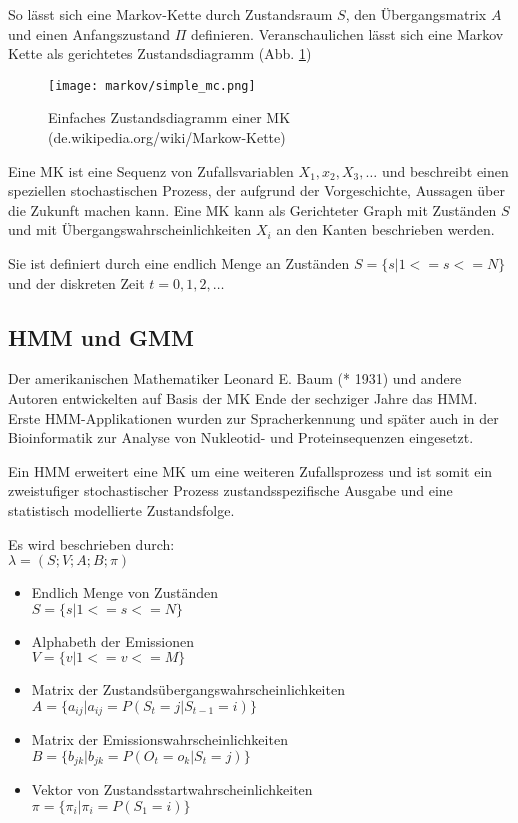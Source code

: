 So lässt sich eine Markov-Kette durch Zustandsraum \(S\), den Übergangsmatrix \( A \) und einen Anfangszustand \( \Pi \) definieren.
Veranschaulichen lässt sich eine Markov Kette als gerichtetes Zustandsdiagramm (Abb. \ref{fig:simple_mc})
\begin{figure}[htbp] \centering
    \texttt{[image: markov/simple\_mc.png]}
    \caption{Einfaches Zustandsdiagramm einer \acl{MK} (de.wikipedia.org/wiki/Markow-Kette)}
    \label{fig:simple_mc}
\end{figure}



Eine \acl{MK} ist eine Sequenz von Zufallsvariablen \( X_1, x_2, X_3, \ldots\) und beschreibt einen speziellen stochastischen Prozess, 
der aufgrund der Vorgeschichte, Aussagen über die Zukunft machen kann. 
Eine \acl{MK} kann als Gerichteter Graph mit Zuständen \(S\) und mit Übergangswahrscheinlichkeiten \(X_i\) an den Kanten beschrieben werden. 

Sie ist definiert durch eine endlich Menge an Zuständen \( S = \{ s | 1 <= s <= N \} \) und der diskreten Zeit \( t = 0, 1, 2, \ldots \) \\


\subsection{\acl{HMM} und \acl{GMM}}  \label{sec:hmm}
Der amerikanischen Mathematiker Leonard E. Baum (* 1931) und andere Autoren entwickelten auf Basis der \acl{MK} Ende der 
sechziger Jahre das \acl{HMM}. Erste \acl{HMM}-Applikationen wurden zur Spracherkennung und später auch in der Bioinformatik 
zur Analyse von Nukleotid- und Proteinsequenzen eingesetzt. 

Ein \acl{HMM} erweitert eine \acl{MK} um eine weiteren Zufallsprozess und ist somit ein zweistufiger stochastischer Prozess \cite[67]{mmmFink}
zustandsspezifische Ausgabe und eine statistisch modellierte Zustandsfolge. 


Es wird beschrieben durch:\\ 
\( \lambda = (S;V;A;B;\pi)\)
\begin{itemize}
     \item Endlich Menge von Zuständen \\
           \( S = \{ s | 1 <= s <= N \} \)
     \item Alphabeth der Emissionen \\
           \( V = \{ v | 1 <= v <= M \} \)
     \item Matrix der Zustandsübergangswahrscheinlichkeiten \\
           \( A = \{ a_{ij} | a_{ij} = P(S_t = j | S_{t-1} = i) \} \)
     \item Matrix der Emissionswahrscheinlichkeiten \\
           \( B = \{ b_{jk} | b_{jk} = P(O_t = o_k | S_t = j) \} \)
     \item Vektor von Zustandsstartwahrscheinlichkeiten \\
           \( \pi = \{ \pi_i | \pi_i = P(S_1 = i) \} \) 
\end{itemize}

